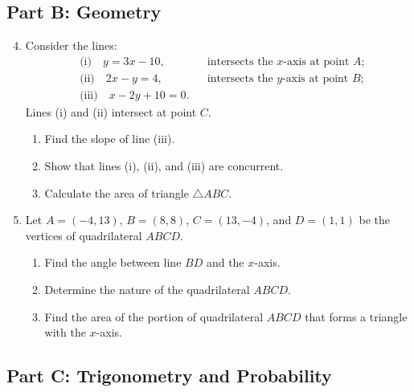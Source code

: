 \documentclass[12pt]{article}
\begin{document}
\subsection*{Part B: Geometry}

\begin{enumerate}
    \setcounter{enumi}{3}
    \item Consider the lines:
    \begin{align*}
        &\text{(i)}\quad y = 3x - 10, &&\text{intersects the } x\text{-axis at point } A; \\
        &\text{(ii)}\quad 2x - y = 4, &&\text{intersects the } y\text{-axis at point } B; \\
        &\text{(iii)}\quad x - 2y + 10 = 0.
    \end{align*}
    Lines (i) and (ii) intersect at point \( C \).
    \begin{enumerate}
        \item Find the slope of line (iii).
        \item Show that lines (i), (ii), and (iii) are concurrent.
        \item Calculate the area of triangle \( \triangle ABC \).
    \end{enumerate}

    \item Let \( A = (-4, 13) \), \( B = (8, 8) \), \( C = (13, -4) \), and \( D = (1, 1) \) be the vertices of quadrilateral \( ABCD \).
    \begin{enumerate}
        \item Find the angle between line \( BD \) and the \( x \)-axis.
        \item Determine the nature of the quadrilateral \( ABCD \).
        \item Find the area of the portion of quadrilateral \( ABCD \) that forms a triangle with the \( x \)-axis.
    \end{enumerate}
\end{enumerate}

\subsection*{Part C: Trigonometry and Probability}
\end{document}
